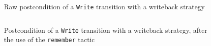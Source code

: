 \documentclass[oneside,a4paper]{memoir}
\theoremstyle{break}
\begin{document}
\begin{figure}
  \inputminted{coq}{Listings/StateHell.v}

  \caption{Raw postcondition of a \texttt{Write} transition with a writeback
    strategy}
  \label{fig:freespec:postcondition}
\end{figure}


\begin{figure}
  \inputminted{coq}{Listings/RememberPattern.v}

  \caption{Postcondition of a \texttt{Write} transition with a writeback
    strategy, after the use of the \texttt{remember} tactic}
  \label{fig:freespec:rememberpost}
\end{figure}

%

\end{document}
